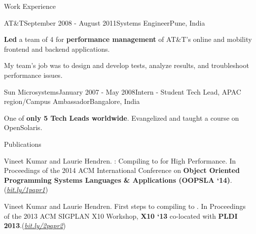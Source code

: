 \documentclass{resume} %
\begin{document}
\begin{rSection}{Work Experience}
\begin{rSubsection}{AT\&T}{September 2008 - August
        2011}{Systems Engineer}{Pune, India}
\item \textbf{Led} a team of 4 for \textbf{performance management}
	of AT\&T's online and mobility frontend and backend applications.
\begin{lsubSubsection}
\item My team's job was to design and develop tests, analyze results, and troubleshoot performance issues.  
\end{lsubSubsection}
\end{rSubsection}

\begin{rSubsection}{Sun Microsystems}{January 2007 - May 2008}{Intern - Student
        Tech Lead, APAC region/Campus Ambassador}{Bangalore, India}
\item One of \textbf{only 5 Tech Leads worldwide}. Evangelized and taught a course on OpenSolaris.  
\end{rSubsection}
\end{rSection}


\begin{rSection}{Publications}
\smallskip
\begin{lSubsection}


\item Vineet Kumar and Laurie Hendren. \mixten: Compiling \matlab to \xten for
	High Performance. In Proceedings of the 2014 ACM International
	Conference on \textbf{Object Oriented Programming Systems Languages \&
	Applications (OOPSLA `14)}.(\href{http://bit.ly/1papr1}{\em{bit.ly/1papr1}})

%
\item Vineet Kumar and Laurie Hendren. First steps to compiling \matlab to
	\xten. In Proceedings of the 2013 ACM SIGPLAN X10 Workshop, \textbf{X10
	`13} co-located with \textbf{PLDI
	2013}.(\href{http://bit.ly/2papr2}{\em{bit.ly/2papr2}})
\end{lSubsection}
\end{rSection}
\end{document}
